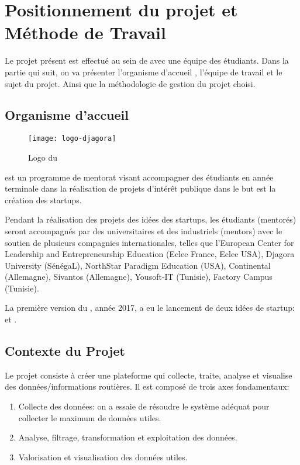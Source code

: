 \chapter{Positionnement du projet et Méthode de Travail}

Le projet présent est effectué au sein de  avec une
équipe des étudiants. Dans la partie qui suit, on va présenter l'organisme
d'accueil , l'équipe de travail et le sujet du
projet. Ainsi que la méthodologie de gestion du projet choisi.

\section{Organisme d'accueil }

\begin{figure}[!h]
    \centering
    \texttt{[image: logo-djagora]}
    \caption{Logo du }
\label{fig:logo-djagora}
\end{figure}

 est un programme de mentorat visant accompagner des
étudiants en année terminale dans la réalisation de projets d'intérêt publique
dans le but est la création des startups.

Pendant la réalisation des projets des idées des startups, les étudiants
(mentorés) seront accompagnés par des universitaires et des industriels
(mentors) avec le soutien de plusieurs compagnies internationales, telles que
l'European Center for Leadership and Entrepreneurship Education (Eclee France,
Eclee USA), Djagora University (SénégaL), NorthStar Paradigm Education (USA),
Continental (Allemagne), Sivantos (Allemagne), Yousoft-IT (Tunisie), Factory
Campus (Tunisie).~\cite{djagora-intro}

La première version du , année 2017, a eu le
lancement de deux idées de startup:  et .

\section{Contexte du Projet}

Le projet  consiste à créer une plateforme qui
collecte, traite, analyse et visualise des données/informations routières. Il
est composé de trois axes fondamentaux:

\begin{enumerate}
    \item Collecte des données: on a essaie de résoudre le système adéquat pour
        collecter le maximum de données utiles.
    \item Analyse, filtrage, transformation et exploitation des données.
    \item Valorisation et visualisation des données utiles.
\end{enumerate}

